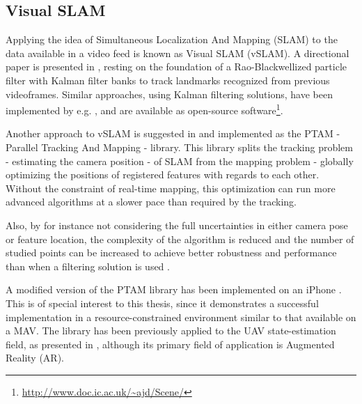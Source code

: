     \subsection{Visual SLAM}
    Applying the idea of Simultaneous Localization And Mapping (SLAM)
    to the data available in a video feed is known as Visual SLAM (vSLAM).
    A directional paper is presented in \citep{Karlsson05thevslam}, resting on the
    foundation of a Rao-Blackwellized particle filter with Kalman filter banks
    to track landmarks recognized from previous videoframes.
    Similar approaches, using Kalman filtering solutions, have been implemented by e.g. \citep{DBLP:conf/iccv/Davison03,Eade:2006:SMS:1153170.1153506},
    and are available as open-source software\footnote{\url{http://www.doc.ic.ac.uk/~ajd/Scene/}}.

    Another approach to vSLAM is suggested in \citep{klein07parallel} and
    implemented as the PTAM - Parallel Tracking And Mapping - library.
    This library splits the tracking problem - estimating the camera position -
    of SLAM from the mapping problem - globally optimizing the positions of
    registered features with regards to each other.
    Without the constraint of real-time mapping, this optimization can run
    more advanced algorithms at a slower pace than required by the tracking.

    Also, by for instance not considering the full uncertainties in either camera pose or feature location,
    the complexity of the algorithm is reduced and the number of studied points
    can be increased to achieve better robustness and
    performance than when a filtering solution is used \citep{DBLP:conf/icra/StrasdatMD10}.

    A modified version of the PTAM library has been implemented on an iPhone \citep{klein09cameraphone}.
    This is of special interest to this thesis, since it demonstrates
    a successful implementation in a resource-constrained environment similar to that available on a MAV.
    The library has been previously applied to the UAV state-estimation field, as presented in \citep{weiss11monocular},
    although its primary field of application is Augmented Reality (AR).

